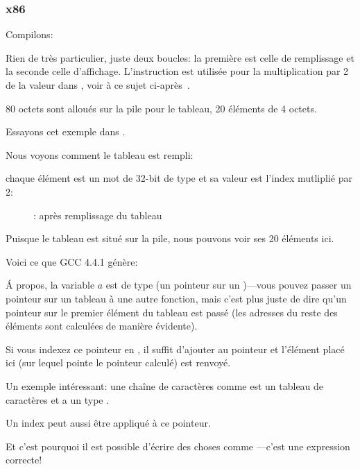 \subsubsection{x86}


Compilons:




Rien de très particulier, juste deux boucles: la première est celle de remplissage
et la seconde celle d'affichage.
L'instruction  est utilisée pour la multiplication par 2 de la valeur
dans \ECX, voir à ce sujet ci-après~.

80 octets sont alloués sur la pile pour le tableau, 20 éléments de 4 octets.

\clearpage
Essayons cet exemple dans \olly.
\myindex{\olly}

Nous voyons comment le tableau est rempli:

chaque élément est un mot de 32-bit de type \Tint et sa valeur est l'index mutliplié
par 2:

\begin{figure}[H]
\centering
{}
\caption{\olly: après remplissage du tableau}
\label{fig:array_simple_olly}
\end{figure}

Puisque le tableau est situé sur la pile, nous pouvons voir ses 20 éléments ici.


Voici ce que GCC 4.4.1 génère:



Á propos, la variable $a$ est de type  (un pointeur sur un \Tint{})---vous
pouvez passer un pointeur sur un tableau à une autre fonction, mais c'est plus juste
de dire qu'un pointeur sur le premier élément du tableau est passé (les adresses
du reste des éléments sont calculées de manière évidente).

Si vous indexez ce pointeur en , il suffit d'ajouter  au pointeur
et l'élément placé ici (sur lequel pointe le pointeur calculé) est renvoyé.

Un exemple intéressant: une chaîne de caractères comme  est un tableau
de caractères et a un type .

Un index peut aussi être appliqué à ce pointeur.

Et c'est pourquoi il est possible d'écrire des choses comme ---c'est
une expression \CCpp correcte!

